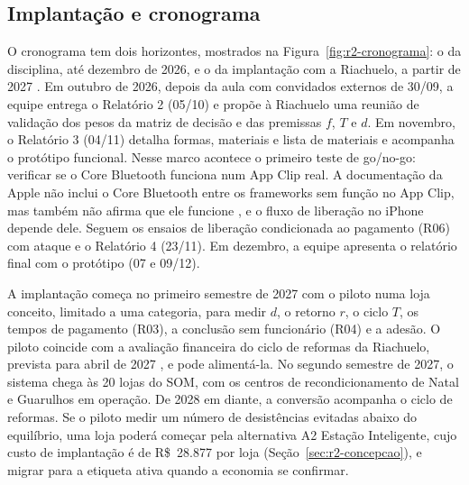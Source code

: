 \subsection{Implantação e cronograma}
\label{sub:r2-cronograma}

O cronograma tem dois horizontes, mostrados na Figura~\ref{fig:r2-cronograma}: o da disciplina, até dezembro de 2026, e o da implantação com a Riachuelo, a partir de 2027 \cite{zancul2026conceitual}. Em outubro de 2026, depois da aula com convidados externos de 30/09, a equipe entrega o Relatório 2 (05/10) e propõe à Riachuelo uma reunião de validação dos pesos da matriz de decisão e das premissas $f$, $T$ e $d$. Em novembro, o Relatório 3 (04/11) detalha formas, materiais e lista de materiais e acompanha o protótipo funcional. Nesse marco acontece o primeiro teste de go/no-go: verificar se o Core Bluetooth funciona num App Clip real. A documentação da Apple não inclui o Core Bluetooth entre os frameworks sem função no App Clip, mas também não afirma que ele funcione \cite{apple2026appclipfuncoes}, e o fluxo de liberação no iPhone depende dele. Seguem os ensaios de liberação condicionada ao pagamento (R06) com ataque e o Relatório 4 (23/11). Em dezembro, a equipe apresenta o relatório final com o protótipo (07 e 09/12).

A implantação começa no primeiro semestre de 2027 com o piloto numa loja conceito, limitado a uma categoria, para medir $d$, o retorno $r$, o ciclo $T$, os tempos de pagamento (R03), a conclusão sem funcionário (R04) e a adesão. O piloto coincide com a avaliação financeira do ciclo de reformas da Riachuelo, prevista para abril de 2027 \cite{economicnews2026riachuelo}, e pode alimentá-la. No segundo semestre de 2027, o sistema chega às 20 lojas do SOM, com os centros de recondicionamento de Natal e Guarulhos em operação. De 2028 em diante, a conversão acompanha o ciclo de reformas. Se o piloto medir um número de desistências evitadas abaixo do equilíbrio, uma loja poderá começar pela alternativa A2 Estação Inteligente, cujo custo de implantação é de R\$~28.877 por loja (Seção~\ref{sec:r2-concepcao}), e migrar para a etiqueta ativa quando a economia se confirmar.

